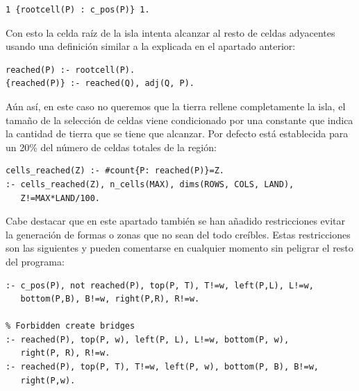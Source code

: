 \begin{lstlisting}[label=lst:croot]
1 {rootcell(P) : c_pos(P)} 1.
\end{lstlisting}

\hspace{1em}

Con esto la celda raíz de la isla intenta alcanzar al resto de celdas adyacentes usando una definición similar a la explicada en el apartado anterior: \\

\begin{lstlisting}[label=lst:croot]
reached(P) :- rootcell(P).
{reached(P)} :- reached(Q), adj(Q, P).
\end{lstlisting}

\hspace{1em}

Aún así, en este caso no queremos que la tierra rellene completamente la isla, el tamaño de la selección de celdas viene condicionado por una constante que indica la cantidad de tierra que se tiene que alcanzar. Por defecto está establecida para un 20\% del número de celdas totales de la región: \\

\begin{lstlisting}[label=lst:cmax]
cells_reached(Z) :- #count{P: reached(P)}=Z.
:- cells_reached(Z), n_cells(MAX), dims(ROWS, COLS, LAND),
   Z!=MAX*LAND/100.
\end{lstlisting}

\hspace{1em}

Cabe destacar que en este apartado también se han añadido restricciones evitar la generación de formas o zonas que no sean del todo creíbles. Estas restricciones son las siguientes y pueden comentarse en cualquier momento sin peligrar el resto del programa: \\

\begin{lstlisting}[label=lst:crestriccions]
% Forbidden create lakes with 1 cell
:- c_pos(P), not reached(P), top(P, T), T!=w, left(P,L), L!=w,
   bottom(P,B), B!=w, right(P,R), R!=w.

% Forbidden create bridges
:- reached(P), top(P, w), left(P, L), L!=w, bottom(P, w),
   right(P, R), R!=w.
:- reached(P), top(P, T), T!=w, left(P, w), bottom(P, B), B!=w,
   right(P,w).
\end{lstlisting}

\hspace{1em}

